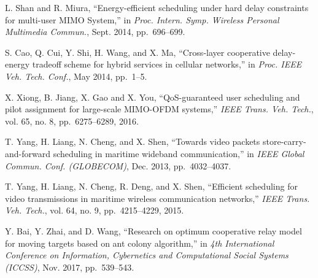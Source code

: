 \documentclass[journal]{IEEEtran}
\begin{document}
\begin{thebibliography}{10}
  L. Shan and R. Miura, ``Energy-efficient scheduling under hard delay constraints for multi-user MIMO System,'' in
  \emph{Proc. Intern. Symp. Wireless Personal Multimedia Commun.}, Sept. 2014, pp.~696--699.
  
  S. Cao, Q. Cui, Y. Shi, H. Wang, and X. Ma, ``Cross-layer cooperative delay-energy tradeoff scheme for hybrid services in cellular networks,'' in
  \emph{Proc. IEEE Veh. Tech. Conf.}, May 2014, pp.~1--5.
  
  X. Xiong, B. Jiang, X. Gao and X. You, ``QoS-guaranteed user scheduling and pilot assignment for large-scale MIMO-OFDM systems,''
  \emph{IEEE Trans. Veh. Tech.}, vol. 65, no. 8, pp.~6275--6289, 2016.
  
  
 
  T. Yang, H. Liang, N. Cheng, and X. Shen, 
  ``Towards video packets store-carry-and-forward scheduling in maritime wideband communication,'' in
  \emph{IEEE Global Commun. Conf. (GLOBECOM)}, Dec. 2013, pp.~4032--4037.
 
  T. Yang, H. Liang, N. Cheng, R. Deng, and X. Shen, ``Efficient scheduling for video transmissions in maritime wireless communication networks,'' 
  \emph{IEEE Trans. Veh. Tech.}, vol. 64, no. 9, pp.~4215--4229, 2015.
 
 
  Y. Bai, Y. Zhai, and D. Wang, 
  ``Research on optimum cooperative relay model for moving targets based on ant colony algorithm,'' in
  \emph{4th International Conference on Information, Cybernetics and Computational Social Systems (ICCSS)}, Nov. 2017, pp.~539--543.
 
 
 
 
 

\end{thebibliography}
\end{document}
